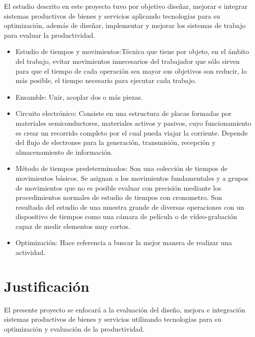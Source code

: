          El estudio descrito en este proyecto tuvo por objetivo diseñar, mejorar e integrar sistemas productivos de bienes y servicios aplicando tecnologías para su optimización, además de diseñar, implementar y mejorar los sistemas de trabajo para evaluar la productividad.
    \begin{itemize}
    
     \item Estudio de  tiempos y movimientos:Técnica que tiene por objeto, en el ámbito del trabajo, evitar movimientos innecesarios del trabajador que sólo sirven para que el tiempo de cada operación sea mayor sus objetivos son reducir, lo más posible, el tiempo necesario para ejecutar cada trabajo.\cite{patent}
     \item Ensamble: Unir, acoplar dos o más piezas.\cite{RAE}
     \item Circuito electrónico: Consiste en una estructura de placas formadas por materiales semiconductores, materiales activos y pasivos, cuyo funcionamiento es crear un recorrido completo por el cual pueda viajar la corriente. Depende del flujo de electrones para la generación, transmisión, recepción y almacenamiento de información.\cite{thomas2007principios}
     \item Método de tiempos predeterminados: Son una colección de tiempos de movimientos básicos. Se asignan a los movimientos fundamentales y a grupos de movimientos que no es posible evaluar con precisión mediante los procedimientos normales de estudio de tiempos con cronometro. Son resultado del estudio de una muestra grande de diversas operaciones con un dispositivo de tiempos como una cámara de película o de vídeo-grabación capaz de medir elementos muy cortos. \cite{niebel1980ingenieria}
     \item Optimización: Hace referencia a buscar la mejor manera de realizar una actividad.\cite{vidalesaplicacion}
     
     \end{itemize}
    \section{Justificación}
    
    
    El presente proyecto se enfocará a la evaluación del diseño, mejora e integración sistemas productivos de bienes y servicios utilizando tecnologías para su optimización y evaluación de la productividad. 
    
